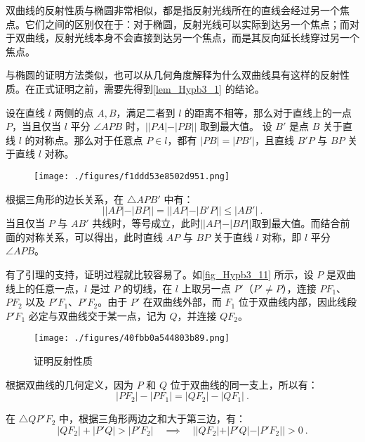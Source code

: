 双曲线的反射性质与椭圆非常相似，都是指反射光线所在的直线会经过另一个焦点。它们之间的区别仅在于：对于椭圆，反射光线可以实际到达另一个焦点；而对于双曲线，反射光线本身不会直接到达另一个焦点，而是其反向延长线穿过另一个焦点。

与椭圆的证明方法类似，也可以从几何角度解释为什么双曲线具有这样的反射性质。在正式证明之前，需要先得到\autoref{lem_Hypb3_1} 的结论。

\begin{lemma}{设在直线 $l$ 两侧的点 $A,B$，满足二者到 $l$ 的距离不相等，那么对于直线上的一点 $P$，当且仅当 $l$ 平分 $\angle APB$ 时，$||PA|-|PB||$ 取到最大值。}\label{lem_Hypb3_1}
设 $B'$ 是点 $B$ 关于直线 $l$ 的对称点。那么对于任意点 $P \in l$，都有 $|PB| = |PB'|$，且直线 $B'P$ 与 $BP$ 关于直线 $l$ 对称。

\begin{figure}[ht]
\centering
\texttt{[image: ./figures/f1ddd53e8502d951.png]}
\caption{} \label{fig_Hypb3_10}
\end{figure}

根据三角形的边长关系，在 $\triangle APB'$ 中有：
\begin{equation}
||AP|-|BP||=||AP|-|B'P||\leq|AB'|~.
\end{equation}
当且仅当 $P$ 与 $AB'$ 共线时，等号成立，此时$||AP|-|BP||$取到最大值。而结合前面的对称关系，可以得出，此时直线 $AP$ 与 $BP$ 关于直线 $l$ 对称，即 $l$ 平分 $\angle APB$。
\end{lemma}

有了引理的支持，证明过程就比较容易了。如\autoref{fig_Hypb3_11} 所示，设 $P$ 是双曲线上的任意一点，$l$ 是过 $P$ 的切线，在 $l$ 上取另一点 $P'$（$P'\neq P$），连接 $PF_1$、$PF_2$ 以及 $P'F_1$、$P'F_2$。由于 $P'$ 在双曲线外部，而 $F_1$ 位于双曲线内部，因此线段 $P'F_1$ 必定与双曲线交于某一点，记为 $Q$，并连接 $QF_2$。

\begin{figure}[ht]
\centering
\texttt{[image: ./figures/40fbb0a544803b89.png]}
\caption{证明反射性质} \label{fig_Hypb3_11}
\end{figure}

根据双曲线的几何定义，因为 $P$ 和 $Q$ 位于双曲线的同一支上，所以有：
\begin{equation}\label{eq_Hypb3_20}
|PF_2| - |PF_1|=|QF_2| - |QF_1|~.
\end{equation}

在 $\triangle QP'F_2$ 中，根据三角形两边之和大于第三边，有：
\begin{equation}
|QF_2| + |P'Q| > |P'F_2|
\quad\implies\quad
||QF_2| + |P'Q| - |P'F_2|| > 0~.
\end{equation}

